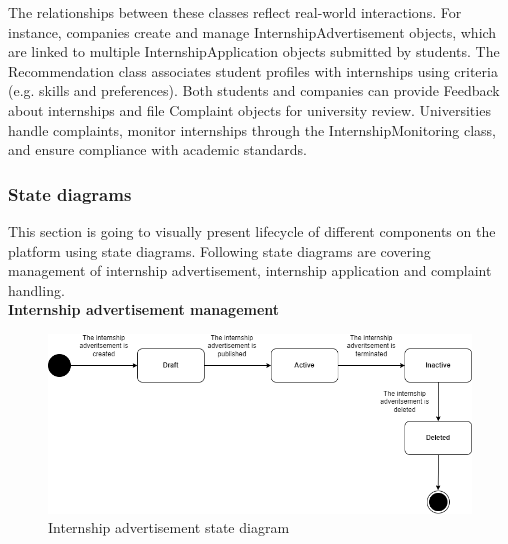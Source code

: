 The relationships between these classes reflect real-world interactions. For instance, companies create and manage InternshipAdvertisement objects, which are linked to multiple InternshipApplication objects submitted by students. The Recommendation class associates student profiles with internships using criteria (e.g. skills and preferences). Both students and companies can provide Feedback about internships and file Complaint objects for university review. Universities handle complaints, monitor internships through the InternshipMonitoring class, and ensure compliance with academic standards.



\subsubsection{State diagrams}

\quad This section is going to visually present lifecycle of different components on the platform using state diagrams. Following state diagrams are covering management of internship advertisement, internship application and complaint handling. \\

\textbf{Internship advertisement management}\\
\begin{figure}[H]
	\includegraphics[width=\textwidth,height=\textheight,keepaspectratio]{RASD-Latex/assets/state_diagram.png}
	\caption{Internship advertisement state diagram}
	\label{fig:DataRequest}
\end{figure}

